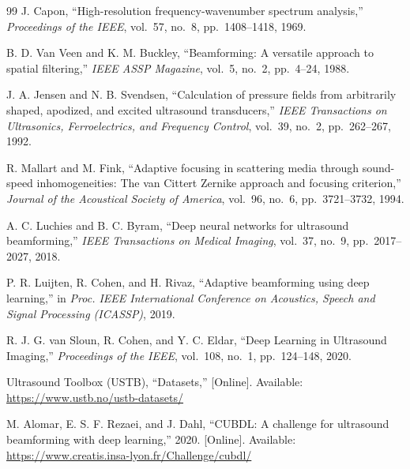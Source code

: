 \documentclass[conference]{IEEEtran}
\begin{document}
\begin{thebibliography}{99}
J. Capon, ``High-resolution frequency-wavenumber spectrum analysis,'' \emph{Proceedings of the IEEE}, vol.~57, no.~8, pp.~1408--1418, 1969.

B. D. Van Veen and K. M. Buckley, ``Beamforming: A versatile approach to spatial filtering,'' \emph{IEEE ASSP Magazine}, vol.~5, no.~2, pp.~4--24, 1988.

J. A. Jensen and N. B. Svendsen, ``Calculation of pressure fields from arbitrarily shaped, apodized, and excited ultrasound transducers,'' \emph{IEEE Transactions on Ultrasonics, Ferroelectrics, and Frequency Control}, vol.~39, no.~2, pp.~262--267, 1992.

R. Mallart and M. Fink, ``Adaptive focusing in scattering media through sound-speed inhomogeneities: The van Cittert Zernike approach and focusing criterion,'' \emph{Journal of the Acoustical Society of America}, vol.~96, no.~6, pp.~3721--3732, 1994.

A. C. Luchies and B. C. Byram, ``Deep neural networks for ultrasound beamforming,'' \emph{IEEE Transactions on Medical Imaging}, vol.~37, no.~9, pp.~2017--2027, 2018.

P. R. Luijten, R. Cohen, and H. Rivaz, ``Adaptive beamforming using deep learning,'' in \emph{Proc. IEEE International Conference on Acoustics, Speech and Signal Processing (ICASSP)}, 2019.

R. J. G. van Sloun, R. Cohen, and Y. C. Eldar, ``Deep Learning in Ultrasound Imaging,'' \emph{Proceedings of the IEEE}, vol.~108, no.~1, pp.~124--148, 2020.

Ultrasound Toolbox (USTB), ``Datasets,'' [Online]. Available: \url{https://www.ustb.no/ustb-datasets/}

M. Alomar, E. S. F. Rezaei, and J. Dahl, ``CUBDL: A challenge for ultrasound beamforming with deep learning,'' 2020. [Online]. Available: \url{https://www.creatis.insa-lyon.fr/Challenge/cubdl/}
\end{thebibliography}
\end{document}
